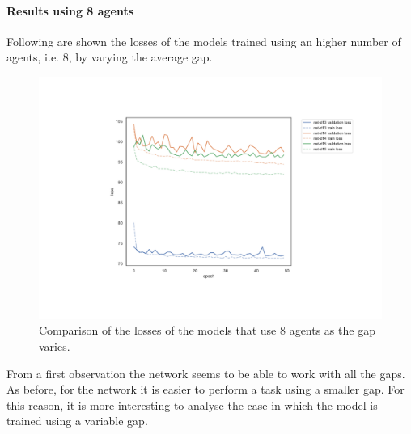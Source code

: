 \paragraph*{Results using 8 agents}
Following are shown the losses of the models trained using an higher number of 
agents, i.e. 8, by varying the average gap.
\begin{figure}[!htb]
	\centering
	\includegraphics[width=.75\textwidth]{contents/images/task1-extension/loss-distributed-n8@}%
	\caption[Comparison of the losses of the models that use $8$ 
	agents.]{Comparison of the losses of the models that use $8$ agents as the gap 
	varies.}
	\label{fig:distlossn8}
\end{figure}
From a first observation the network seems to be able to work with all the gaps.
As before, for the network it is easier to perform a task using a smaller gap.
For this reason, it is more interesting to analyse the case in which the model 
is trained using a variable gap.

